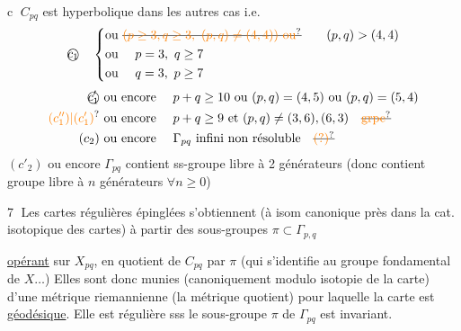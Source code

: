 \textcircled{c} $C_{pq}$ est hyperbolique dans les autres cas i.e.   
\[
\text{\textcircled{$c_1$}}\quad
\left\{\begin{aligned}
&\text{ou }\deleted{\unsure{(p\geq3,q\geq3,\ (p,q)\ne(4,4))\ \text{ou}}}\qquad(p,q)>(4,4)\\
&\text{ou }\quad p=3,\ q\geq7\\
&\text{ou }\quad q=3,\ p\geq7
\end{aligned}\right.
\]
\[
\begin{aligned}
\text{\textcircled{$c'_1$}}\ &\text{ou encore }\quad p+q\geq10\ \text{ou }(p,q)=(4,5)\ \text{ou }(p,q)=(5,4)\\
\unsure{(c''_1)|(c'_1)}\ &\text{ou encore }\quad p+q\geq9\ \text{et }(p,q)\ne(3,6),(6,3)\quad\deleted{\unsure{\text{grpe}}}\\
(c_2)\ &\text{ou encore }\quad\Gamma_{pq}\ \text{infini non résoluble}\quad\deleted{\unsure{(?)}}
\end{aligned}
\]
$(c'_2)$ ou encore $\Gamma_{pq}$ contient ss-groupe libre à 2 générateurs (donc contient  groupe libre à $n$ générateurs $\forall n\geq0$)

\margin{$\checkmark$}
\textcircled{7} Les cartes régulières  épinglées  s'obtiennent (à isom canonique près dans la cat. isotopique des cartes) à partir des sous-groupes $\pi\subset\Gamma_{p,q}$

\uline{opérant}   sur $X_{pq}$, en  quotient de $C_{pq}$ par $\pi$ (qui s'identifie au groupe fondamental de $X\ldots$) Elles sont donc munies (canoniquement modulo isotopie de la carte) d'une métrique riemannienne (la métrique quotient) pour laquelle la carte est \uline{géodésique}.  Elle est régulière sss le sous-groupe $\pi$ de $\Gamma_{pq}$ est invariant.

